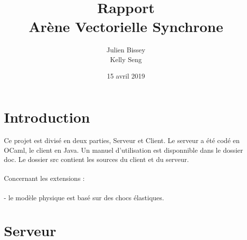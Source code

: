 \documentclass{article}
\begin{document}
\title{Rapport\\
Arène Vectorielle Synchrone{}}
\author{Julien Bissey\\Kelly Seng}
\date{15 avril 2019}

\maketitle

\section{Introduction}

Ce projet est divisé en deux parties, Serveur et Client.
Le serveur a été codé en OCaml, le client en Java.
Un manuel d'utilisation est disponnible dans le dossier doc. Le dossier src contient les sources du client et du serveur.\\
\\
Concernant les extensions :\\
\\
- le modèle physique est basé sur des chocs élastiques.

\section{Serveur}
\end{document}
